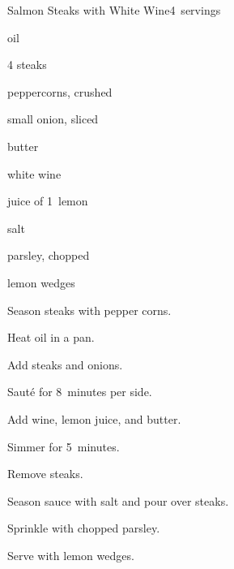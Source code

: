 \begin{recipe}{Salmon Steaks with White Wine}{}{4~servings}

\begin{ingredients}
\item {} oil
\item 4   steaks
\item {} peppercorns, crushed
\item small onion, sliced
\item {} butter
\item {} white wine
\item juice of 1~lemon
\item salt
\item {} parsley, chopped
\item lemon wedges
\end{ingredients}

\begin{directions}
\item Season steaks with pepper corns.
\item Heat oil in a pan.
\item Add steaks and onions.
\item Saut\'e for 8~minutes per side.
\item Add wine, lemon juice, and butter.
\item Simmer for 5~minutes.
\item Remove steaks.
\item Season sauce with salt and pour over steaks.
\item Sprinkle with chopped parsley.
\item Serve with lemon wedges.
\end{directions}

\end{recipe}
